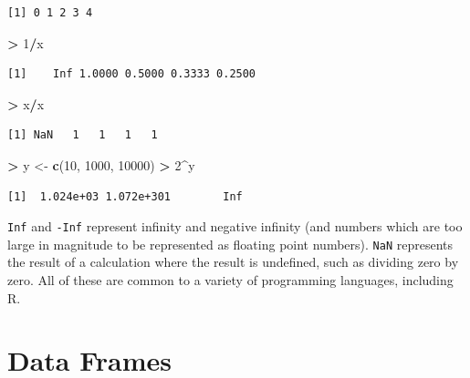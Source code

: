 \documentclass[
]{krantz}
\makeatletter
\newenvironment{Shaded}{\begin{snugshade}}{\end{snugshade}}
\newcommand{\DecValTok}[1]{\textcolor[rgb]{0.06,0.06,0.06}{#1}}
\newcommand{\KeywordTok}[1]{\textcolor[rgb]{0.27,0.27,0.27}{\textbf{#1}}}
\newcommand{\NormalTok}[1]{#1}
\newcommand{\OperatorTok}[1]{\textcolor[rgb]{0.43,0.43,0.43}{\textbf{#1}}}
\newcommand{\StringTok}[1]{\textcolor[rgb]{0.5,0.5,0.5}{#1}}
\newenvironment{kframe}{%
\medskip{}
\setlength{\fboxsep}{.8em}
 \def\at@end@of@kframe{}%
 \ifinner\ifhmode%
  \def\at@end@of@kframe{\end{minipage}}%
  \begin{minipage}{\columnwidth}%
 \fi\fi%
 \def\FrameCommand##1{\hskip\@totalleftmargin \hskip-\fboxsep
 \colorbox{shadecolor}{##1}\hskip-\fboxsep
     \hskip-\linewidth \hskip-\@totalleftmargin \hskip\columnwidth}%
 \MakeFramed {\advance\hsize-\width
   \@totalleftmargin\z@ \linewidth\hsize
   \@setminipage}}%
 {\par\unskip\endMakeFramed%
 \at@end@of@kframe}
\renewenvironment{Shaded}{\begin{kframe}}{\end{kframe}}
\makeatother
\begin{document}
\begin{verbatim}
[1] 0 1 2 3 4
\end{verbatim}

\begin{Shaded}
\begin{Highlighting}[]
\OperatorTok{\textgreater{}}\StringTok{ }\DecValTok{1}\OperatorTok{/}\NormalTok{x}
\end{Highlighting}
\end{Shaded}

\begin{verbatim}
[1]    Inf 1.0000 0.5000 0.3333 0.2500
\end{verbatim}

\begin{Shaded}
\begin{Highlighting}[]
\OperatorTok{\textgreater{}}\StringTok{ }\NormalTok{x}\OperatorTok{/}\NormalTok{x}
\end{Highlighting}
\end{Shaded}

\begin{verbatim}
[1] NaN   1   1   1   1
\end{verbatim}

\begin{Shaded}
\begin{Highlighting}[]
\OperatorTok{\textgreater{}}\StringTok{ }\NormalTok{y \textless{}{-}}\StringTok{ }\KeywordTok{c}\NormalTok{(}\DecValTok{10}\NormalTok{, }\DecValTok{1000}\NormalTok{, }\DecValTok{10000}\NormalTok{)}
\OperatorTok{\textgreater{}}\StringTok{ }\DecValTok{2}\OperatorTok{\^{}}\NormalTok{y}
\end{Highlighting}
\end{Shaded}

\begin{verbatim}
[1]  1.024e+03 1.072e+301        Inf
\end{verbatim}

\texttt{Inf} and \texttt{-Inf} represent infinity and negative infinity (and numbers which are too large in magnitude to be represented as floating point numbers). \texttt{NaN} represents the result of a calculation where the result is undefined, such as dividing zero by zero. All of these are common to a variety of programming languages, including R.

\hypertarget{dataFrames}{%
\section{Data Frames}\label{dataFrames}}
\end{document}
